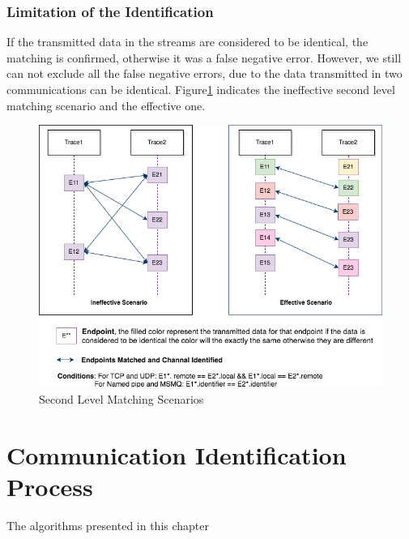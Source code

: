 \subsubsection{Limitation of the Identification}
If the transmitted data in the streams are considered to be identical, the matching is confirmed, otherwise it was a false negative error. However, we still can not exclude all the false negative errors, due to the data transmitted in two communications can be identical. Figure\ref{secondlevelmatching} indicates the ineffective second level matching scenario and the effective one.

\begin{figure}[H]
\centerline{\includegraphics[scale=0.55]{Figures/secondlevelmatching}}
 \caption{Second Level Matching Scenarios}
\label{secondlevelmatching}
\end{figure}

\section{Communication Identification Process}
The algorithms presented in this chapter

